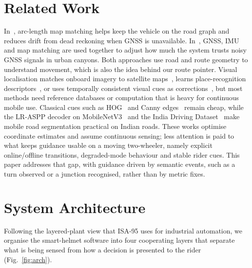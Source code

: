 \documentclass[conference]{IEEEtran}
\begin{document}
\section{Related Work}
\label{sec:related}

In~\cite{javed2025arc}, arc-length map matching helps keep the vehicle on the road graph and reduces drift from dead reckoning when GNSS is unavailable. In~\cite{wang2025gnss}, GNSS, IMU and map matching are used together to adjust how much the system trusts noisy GNSS signals in urban canyons. Both approaches use road and route geometry to understand movement, which is also the idea behind our route pointer. Visual localisation matches onboard imagery to satellite maps~\cite{lin2025gnss}, learns place-recognition descriptors~\cite{li2024cspformer,he2026guiding}, or uses temporally consistent visual cues as corrections~\cite{xu2026enhanced,shpagin2026naviloc,wang2026particle}, but most methods need reference databases or computation that is heavy for continuous mobile use. Classical cues such as HOG~\cite{dalal2005hog} and Canny edges~\cite{canny1986} remain cheap, while the LR-ASPP decoder on MobileNetV3~\cite{howard2019searching} and the India Driving Dataset~\cite{iddvarma2019} make mobile road segmentation practical on Indian roads. These works optimise coordinate estimates and assume continuous sensing; less attention is paid to what keeps guidance usable on a moving two-wheeler, namely explicit online/offline transitions, degraded-mode behaviour and stable rider cues. This paper addresses that gap, with guidance driven by semantic events, such as a turn observed or a junction recognised, rather than by metric fixes.

\section{System Architecture}
\label{sec:arch}

Following the layered-plant view that ISA-95 uses for industrial automation, we organise the smart-helmet software into four cooperating layers that separate what is being sensed from how a decision is presented to the rider (Fig.~\ref{fig:arch}).
\end{document}
